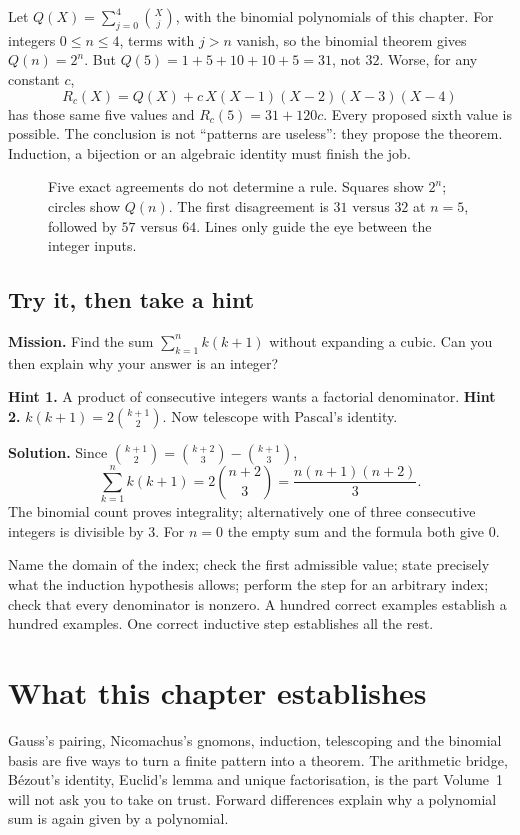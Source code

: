 \begin{examplex}
Let $Q(X)=\sum_{j=0}^4\binom Xj$, with the binomial polynomials of this chapter. For integers $0\le n\le4$, terms with $j>n$ vanish, so the binomial theorem gives $Q(n)=2^n$. But $Q(5)=1+5+10+10+5=31$, not $32$. Worse, for any constant $c$,
\[
R_c(X)=Q(X)+c\,X(X-1)(X-2)(X-3)(X-4)
\]
has those same five values and $R_c(5)=31+120c$. Every proposed sixth value is possible. The conclusion is not ``patterns are useless'': they propose the theorem. Induction, a bijection or an algebraic identity must finish the job.
\end{examplex}

\begin{figure}[ht]\centering{}
\caption{Five exact agreements do not determine a rule. Squares show $2^n$; circles show $Q(n)$. The first disagreement is $31$ versus $32$ at $n=5$, followed by $57$ versus $64$. Lines only guide the eye between the integer inputs.}\end{figure}

\subsection*{Try it, then take a hint}
\textbf{Mission.} Find the sum $\sum_{k=1}^n k(k+1)$ without expanding a cubic. Can you then explain why your answer is an integer?

\textbf{Hint 1.} A product of consecutive integers wants a factorial denominator. \textbf{Hint 2.} $k(k+1)=2\binom{k+1}2$. Now telescope with Pascal's identity.

\textbf{Solution.} Since $\binom{k+1}2=\binom{k+2}3-\binom{k+1}3$,
\[
\sum_{k=1}^n k(k+1)=2\binom{n+2}3=\frac{n(n+1)(n+2)}3.
\]
The binomial count proves integrality; alternatively one of three consecutive integers is divisible by $3$. For $n=0$ the empty sum and the formula both give $0$.

\begin{reminder}
Name the domain of the index; check the first admissible value; state precisely what the induction hypothesis allows; perform the step for an arbitrary index; check that every denominator is nonzero. A hundred correct examples establish a hundred examples. One correct inductive step establishes all the rest.
\end{reminder}

\section*{What this chapter establishes}
Gauss's pairing, Nicomachus's gnomons, induction, telescoping and the binomial basis are five ways to turn a finite pattern into a theorem. The arithmetic bridge, Bézout's identity, Euclid's lemma and unique factorisation, is the part Volume~1 will not ask you to take on trust. Forward differences explain why a polynomial sum is again given by a polynomial.

